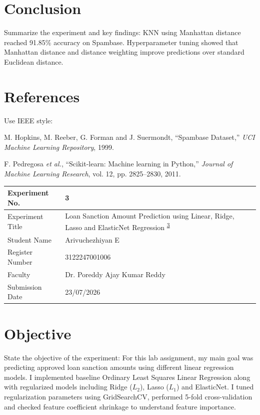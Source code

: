 \documentclass[12pt,a4paper]{article}
\begin{document}
\section{Conclusion}
Summarize the experiment and key findings:
KNN using Manhattan distance reached 91.85\% accuracy on Spambase. Hyperparameter tuning showed that Manhattan distance and distance weighting improve predictions over standard Euclidean distance.

\section{References}
Use IEEE style:
\begin{enumerate}[label={[\arabic*]}]
\item M. Hopkins, M. Reeber, G. Forman and J. Suermondt, ``Spambase Dataset,'' \textit{UCI Machine Learning Repository}, 1999.
\item F. Pedregosa \textit{et al.}, ``Scikit-learn: Machine learning in Python,'' \textit{Journal of Machine Learning Research}, vol. 12, pp. 2825--2830, 2011.
\end{enumerate}

\newpage


\begin{tabular}{|p{4cm}|p{11cm}|}
\hline
Experiment No. & 3 \\ \hline
Experiment Title & Loan Sanction Amount Prediction using Linear, Ridge, Lasso and ElasticNet Regression \textsuperscript{\href{https://github.com/arivuchezhiyan/Machine_Learning/tree/main/experiment_3}{3}} \\ \hline
Student Name & Arivuchezhiyan E \\ \hline
Register Number & 3122247001006 \\ \hline
Faculty & Dr. Poreddy Ajay Kumar Reddy \\ \hline
Submission Date & 23/07/2026 \\ \hline
\end{tabular}

\section{Objective}
State the objective of the experiment:
For this lab assignment, my main goal was predicting approved loan sanction amounts using different linear regression models. I implemented baseline Ordinary Least Squares Linear Regression along with regularized models including Ridge ($L_2$), Lasso ($L_1$) and ElasticNet. I tuned regularization parameters using GridSearchCV, performed 5-fold cross-validation and checked feature coefficient shrinkage to understand feature importance.
\end{document}
